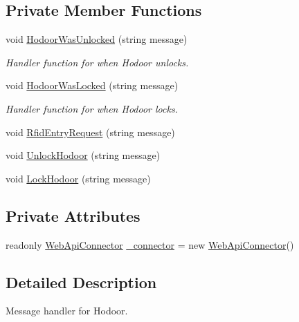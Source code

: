 \subsection*{Private Member Functions}
\begin{DoxyCompactItemize}
\item 
void \mbox{\hyperlink{class_master_application_1_1_message_handlers_1_1_hodoor_message_handler_a1d0cb1162818545b40782509d5838300}{Hodoor\+Was\+Unlocked}} (string message)
\begin{DoxyCompactList}\small\item\em Handler function for when Hodoor unlocks. \end{DoxyCompactList}\item 
void \mbox{\hyperlink{class_master_application_1_1_message_handlers_1_1_hodoor_message_handler_aa21641d765da50865bf1bfff9a59e73f}{Hodoor\+Was\+Locked}} (string message)
\begin{DoxyCompactList}\small\item\em Handler function for when Hodoor locks. \end{DoxyCompactList}\item 
void \mbox{\hyperlink{class_master_application_1_1_message_handlers_1_1_hodoor_message_handler_ae7e94ce6ba8ed60c3ba9fde613c76e1b}{Rfid\+Entry\+Request}} (string message)
\item 
void \mbox{\hyperlink{class_master_application_1_1_message_handlers_1_1_hodoor_message_handler_a9977e84f9848d7be4d4f1ab589323dcf}{Unlock\+Hodoor}} (string message)
\item 
void \mbox{\hyperlink{class_master_application_1_1_message_handlers_1_1_hodoor_message_handler_a2303b565214e664a7cab48341e9f4821}{Lock\+Hodoor}} (string message)
\end{DoxyCompactItemize}
\subsection*{Private Attributes}
\begin{DoxyCompactItemize}
\item 
readonly \mbox{\hyperlink{class_master_application_1_1_web_api_connector}{Web\+Api\+Connector}} \mbox{\hyperlink{class_master_application_1_1_message_handlers_1_1_hodoor_message_handler_abe79d0f7853328d474992ef055523f11}{\+\_\+connector}} = new \mbox{\hyperlink{class_master_application_1_1_web_api_connector}{Web\+Api\+Connector}}()
\end{DoxyCompactItemize}


\subsection{Detailed Description}
Message handler for Hodoor. 

